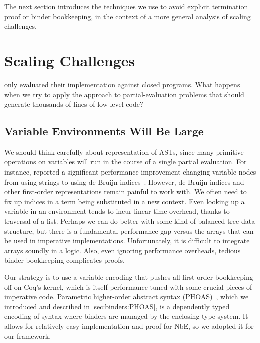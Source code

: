 The next section introduces the techniques we use to avoid explicit termination proof or binder bookkeeping, in the context of a more general analysis of scaling challenges.


\section{Scaling Challenges}\label{sec:scaling}

\textcite{Aehlig} only evaluated their implementation against closed programs.
What happens when we try to apply the approach to partial-evaluation problems that should generate thousands of lines of low-level code?

\subsection{Variable Environments Will Be Large}\label{sec:PHOAS}
We should think carefully about representation of ASTs, since many primitive operations on variables will run in the course of a single partial evaluation.
For instance, \textcite{Aehlig} reported a significant performance improvement changing variable nodes from using strings to using de Bruijn indices~\cite{debruijn1972}.
However, de Bruijn indices and other first-order representations remain painful to work with.
We often need to fix up indices in a term being substituted in a new context.
Even looking up a variable in an environment tends to incur linear time overhead, thanks to traversal of a list.
Perhaps we can do better with some kind of balanced-tree data structure, but there is a fundamental performance gap versus the arrays that can be used in imperative implementations.
Unfortunately, it is difficult to integrate arrays soundly in a logic.
Also, even ignoring performance overheads, tedious binder bookkeeping complicates proofs.

Our strategy is to use a variable encoding that pushes all first-order bookkeeping off on Coq's kernel, which is itself performance-tuned with some crucial pieces of imperative code.
Parametric higher-order abstract syntax (PHOAS)~\cite{PhoasICFP08}, which we introduced and described in \autoref{sec:binders:PHOAS}, is a dependently typed encoding of syntax where binders are managed by the enclosing type system.
It allows for relatively easy implementation and proof for NbE, so we adopted it for our framework.

